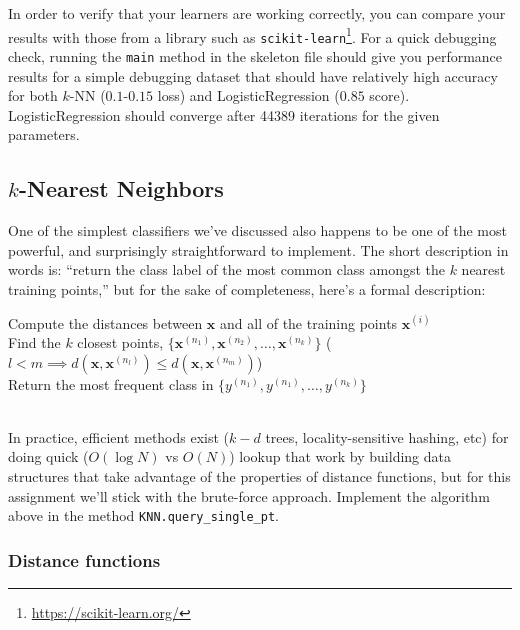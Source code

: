 \documentclass{article}
\begin{document}
In order to verify that your learners are working correctly, you can compare your results with those from a library such as \texttt{scikit-learn}\footnote{\url{https://scikit-learn.org/}}. For a quick debugging check, running the \texttt{main} method in the skeleton file should give you performance results for a simple debugging dataset that should have relatively high accuracy for both \(k\)-NN (\(0.1\)-\(0.15\) loss) and LogisticRegression (\(0.85\) score). LogisticRegression should converge after 44389 iterations for the given parameters.

\subsection*{\(k\)-Nearest Neighbors}

One of the simplest classifiers we've discussed also happens to be one of the most powerful, and surprisingly straightforward to implement. The short description in words is: ``return the class label of the most common class amongst the \(k\) nearest training points,'' but for the sake of completeness, here's a formal description:

\begin{algorithm}[H]
	\SetAlgoLined
	Compute the distances between \(\mathbf{x}\) and all of the training points \(\mathbf{x}^{(i)}\)\\
	Find the \(k\) closest points, \(\{\mathbf{x}^{(n_1)}, \mathbf{x}^{(n_2)},\ldots,\mathbf{x}^{(n_k)}\}\) (\(l<m \implies d(\mathbf{x},\mathbf{x}^{(n_l)}) \leq d(\mathbf{x},\mathbf{x}^{(n_m)})\))\\
	Return the most frequent class in \(\{y^{(n_1)},y^{(n_1)},\ldots,y^{(n_k)}\}\)\\
	~
\end{algorithm}

In practice, efficient methods exist (\(k-d\) trees, locality-sensitive hashing, etc) for doing quick (\(O(\log N)\) vs \(O(N)\)) lookup that work by building data structures that take advantage of the properties of distance functions, but for this assignment we'll stick with the brute-force approach. Implement the algorithm above in the method \texttt{KNN.query\_single\_pt}.

\subsubsection*{Distance functions}
\end{document}
